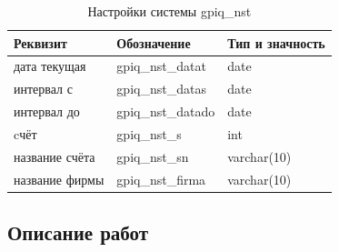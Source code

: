 \begin{table}[h!p]
    \centering
    \scriptsize
    \caption{Настройки системы gpiq\_nst}
    \begin{tabular}{|l|l|l|} 

                                                                               \hline
\textbf{Реквизит}       &\textbf{Обозначение}   &\textbf{Тип и значность}   \\ \hline
дата текущая            &gpiq\_nst\_datat       &date                       \\ \hline
интервал с              &gpiq\_nst\_datas       &date                       \\ \hline
интервал до             &gpiq\_nst\_datado      &date                       \\ \hline
cчёт                    &gpiq\_nst\_s           &int                        \\ \hline
название счёта          &gpiq\_nst\_sn          &varchar(10)                \\ \hline
название фирмы          &gpiq\_nst\_firma       &varchar(10)                \\ \hline

    \end{tabular}
\end{table}

\subsection{Описание работ}

